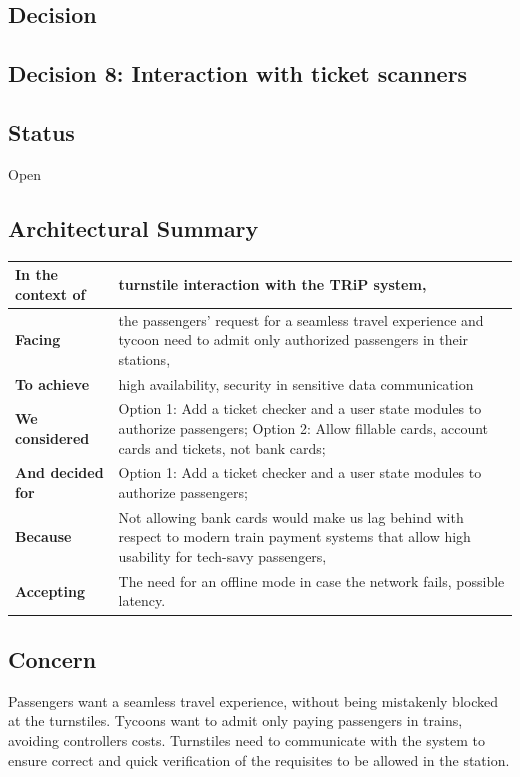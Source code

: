 \subsection*{Decision}

\subsection{Decision 8: Interaction with ticket scanners}

\subsection*{Status}
Open
\subsection*{Architectural Summary}
\begin{tabular}{|p{3.5cm}|p{10.5cm}|}
    \hline
    \textbf{In the context of} & turnstile interaction with the TRiP system, \\
    \hline
    \textbf{Facing} & the passengers' request for a seamless travel experience and tycoon need to admit only authorized passengers in their stations, \\
    \hline
    \textbf{To achieve} & high availability, security in sensitive data communication \\
    \hline
    \textbf{We considered} & Option 1: Add a ticket checker and a user state modules to authorize passengers; Option 2: Allow fillable cards, account cards and tickets, not bank cards;\\
    \hline
    \textbf{And decided for} & Option 1: Add a ticket checker and a user state modules to authorize passengers;\\
    \hline
    \textbf{Because} & Not allowing bank cards would make us lag behind with respect to modern train payment systems that allow high usability for tech-savy passengers, \\
    \hline
    \textbf{Accepting} & The need for an offline mode in case the network fails, possible latency. \\
    \hline
\end{tabular}

\subsection*{Concern}
Passengers want a seamless travel experience, without being mistakenly blocked at the turnstiles.
Tycoons want to admit only paying passengers in trains, avoiding controllers costs.
Turnstiles need to communicate with the system to ensure correct and quick verification of the requisites to be allowed in the station.

